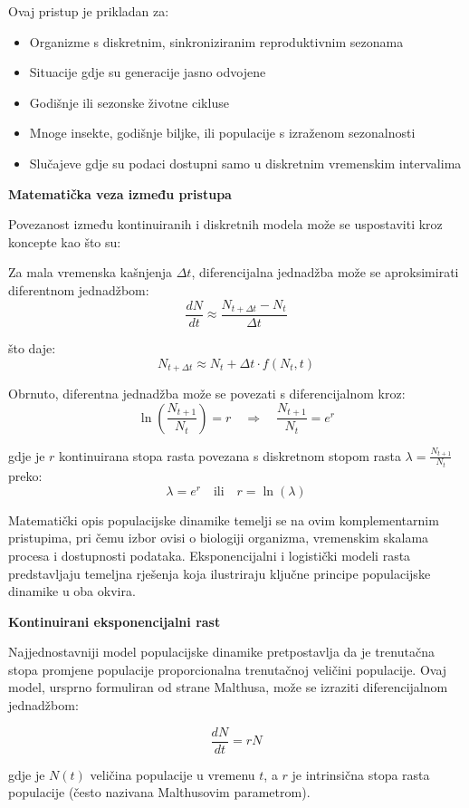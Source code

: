 \documentclass[11pt,oneside]{book}
\begin{document}
Ovaj pristup je prikladan za:
\begin{itemize}
	\item Organizme s diskretnim, sinkroniziranim reproduktivnim sezonama
	\item Situacije gdje su generacije jasno odvojene
	\item Godišnje ili sezonske životne cikluse
	\item Mnoge insekte, godišnje biljke, ili populacije s izraženom sezonalnosti
	\item Slučajeve gdje su podaci dostupni samo u diskretnim vremenskim intervalima
\end{itemize}

\textbf{Matematička veza između pristupa}

Povezanost između kontinuiranih i diskretnih modela može se uspostaviti kroz koncepte kao što su:

Za mala vremenska kašnjenja $\Delta t$, diferencijalna jednadžba može se aproksimirati diferentnom jednadžbom:
$$\frac{dN}{dt} \approx \frac{N_{t+\Delta t} - N_t}{\Delta t}$$

što daje:
$$N_{t+\Delta t} \approx N_t + \Delta t \cdot f(N_t, t)$$

Obrnuto, diferentna jednadžba može se povezati s diferencijalnom kroz:
$$\ln\left(\frac{N_{t+1}}{N_t}\right) = r \quad \Rightarrow \quad \frac{N_{t+1}}{N_t} = e^r$$

gdje je $r$ kontinuirana stopa rasta povezana s diskretnom stopom rasta $\lambda = \frac{N_{t+1}}{N_t}$ preko:
$$\lambda = e^r \quad \text{ili} \quad r = \ln(\lambda)$$

Matematički opis populacijske dinamike temelji se na ovim komplementarnim pristupima, pri čemu izbor ovisi o biologiji organizma, vremenskim skalama procesa i dostupnosti podataka. Eksponencijalni i logistički modeli rasta predstavljaju temeljna rješenja koja ilustriraju ključne principe populacijske dinamike u oba okvira.

\textbf{Kontinuirani eksponencijalni rast}

Najjednostavniji model populacijske dinamike pretpostavlja da je trenutačna stopa promjene populacije proporcionalna trenutačnoj veličini populacije. Ovaj model, ursprno formuliran od strane Malthusa, može se izraziti diferencijalnom jednadžbom:

$$\frac{dN}{dt} = rN$$

gdje je $N(t)$ veličina populacije u vremenu $t$, a $r$ je intrinsična stopa rasta populacije (često nazivana Malthusovim parametrom).
\end{document}
